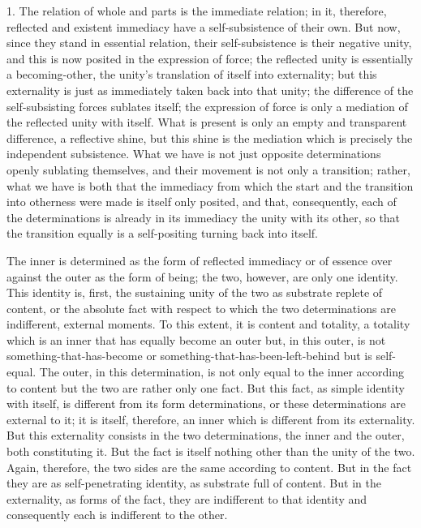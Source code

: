 1. The relation of whole and parts is the immediate relation;
in it, therefore, reflected and existent immediacy have
a self-subsistence of their own.
But now, since they stand in essential relation,
their self-subsistence is their negative unity,
and this is now posited in the expression of force;
the reflected unity is essentially a becoming-other,
the unity’s translation of itself into externality;
but this externality is just as immediately taken back into that unity;
the difference of the self-subsisting forces sublates itself;
the expression of force is only a mediation of the reflected unity with itself.
What is present is only an empty and transparent difference, a reflective shine,
but this shine is the mediation which is precisely the independent subsistence.
What we have is not just opposite determinations openly sublating themselves,
and their movement is not only a transition;
rather, what we have is both that the immediacy
from which the start and the transition into otherness
were made is itself only posited,
and that, consequently, each of the determinations is
already in its immediacy the unity with its other,
so that the transition equally is a self-positing turning back into itself.

The inner is determined as the form of reflected immediacy or of essence
over against the outer as the form of being;
the two, however, are only one identity.
This identity is, first, the sustaining unity of the two as
substrate replete of content, or the absolute fact with respect to which
the two determinations are indifferent, external moments.
To this extent, it is content and totality, a totality
which is an inner that has equally become an outer
but, in this outer, is not something-that-has-become
or something-that-has-been-left-behind but is self-equal.
The outer, in this determination, is not only
equal to the inner according to content
but the two are rather only one fact.
But this fact, as simple identity with itself, is
different from its form determinations,
or these determinations are external to it;
it is itself, therefore, an inner which is different from its externality.
But this externality consists in the two determinations,
the inner and the outer, both constituting it.
But the fact is itself nothing other than the unity of the two.
Again, therefore, the two sides are the same according to content.
But in the fact they are as self-penetrating identity,
as substrate full of content.
But in the externality, as forms of the fact,
they are indifferent to that identity
and consequently each is indifferent to the other.

